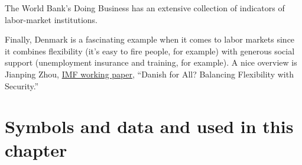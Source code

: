 The World Bank's Doing Business has an extensive collection of
{indicators} of labor-market institutions.

Finally, Denmark is a fascinating example when it comes to labor markets
since it combines flexibility (it's easy to fire people, for example)
with generous social support (unemployment insurance
and training, for example).
A nice overview is
Jianping Zhou,
\href{http://www.imf.org/external/pubs/ft/wp/2007/wp0736.pdf}
{IMF working paper},
``Danish for All? Balancing Flexibility with Security.''

{}
\section*{Symbols and data and used in this chapter}

